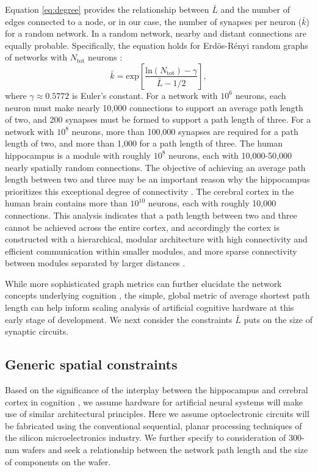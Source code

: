 \documentclass[twocolumn]{article}
\begin{document}
Equation \ref{eq:degree} provides the relationship between $\bar{L}$ and the number of edges connected to a node, or in our case, the number of synapses per neuron ($\bar{k}$) for a random network. In a random network, nearby and distant connections are equally probable. Specifically, the equation holds for Erd\"{o}s-R\'{e}nyi random graphs of networks with $N_{\mathrm{tot}}$ neurons \cite{frfr2004}:
\begin{equation}
\label{eq:degree}
\bar{k} = \mathrm{exp} \left[ \frac{\mathrm{ln}(N_{\mathrm{tot}})-\gamma}{\bar{L}-1/2} \right],
\end{equation}
where $\gamma \approx 0.5772$ is Euler's constant. For a network with $10^6$ neurons, each neuron must make nearly 10,000 connections to support an average path length of two, and 200 synapses must be formed to support a path length of three. For a network with $10^8$ neurons, more than 100,000 synapses are required for a path length of two, and more than 1,000 for a path length of three. The human hippocampus is a module with roughly $10^8$ neurons, each with 10,000-50,000 nearly spatially random connections. The objective of achieving an average path length between two and three may be an important reason why the hippocampus prioritizes this exceptional degree of connectivity \cite{bu2006}. The cerebral cortex in the human brain contains more than $10^{10}$ neurons, each with roughly 10,000 connections. This analysis indicates that a path length between two and three cannot be achieved across the entire cortex, and accordingly the cortex is constructed with a hierarchical, modular architecture \cite{si1962, mela2010} with high connectivity and efficient communication within smaller modules, and more sparse connectivity between modules separated by larger distances \cite{mo1997,mela2010,bosp2015,beba2017}.

While more sophisticated graph metrics can further elucidate the network concepts underlying cognition \cite{busp2009}, the simple, global metric of average shortest path length can help inform scaling analysis of artificial cognitive hardware at this early stage of development. We next consider the constraints $\bar{L}$ puts on the size of synaptic circuits.

\subsection{Generic spatial constraints}
\label{sec:spatial_constraints}
Based on the significance of the interplay between the hippocampus and cerebral cortex in cognition \cite{frbu2016}, we assume hardware for artificial neural systems will make use of similar architectural principles. Here we assume optoelectronic circuits will be fabricated using the conventional sequential, planar processing techniques of the silicon microelectronics industry. We further specify to consideration of 300-mm wafers and seek a relationship between the network path length and the size of components on the wafer.
\end{document}
